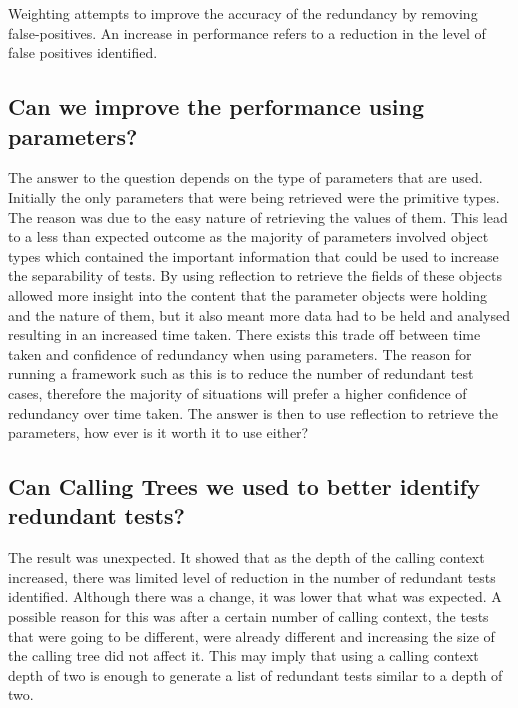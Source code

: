 Weighting attempts to improve the accuracy of the redundancy by removing false-positives. An increase in performance refers to a reduction in the level of false positives identified. 


\subsection{Can we improve the performance using parameters?}

The answer to the question depends on the type of parameters that are used. Initially the only parameters that were being retrieved were the primitive types. The reason was due to the easy nature of retrieving the values of them. This lead to a less than expected outcome as the majority of parameters involved object types which contained the important information that could be used to increase the separability of tests. By using reflection to retrieve the fields of these objects allowed more insight into the content that the parameter objects were holding and the nature of them, but it also meant more data had to be held and analysed resulting in an increased time taken. There exists this trade off between time taken and confidence of redundancy when using parameters. The reason for running a framework such as this is to reduce the number of redundant test cases, therefore the majority of situations will prefer a higher confidence of redundancy over time taken. The answer is then to use reflection to retrieve the parameters, how ever is it worth it to use either?


\subsection{Can Calling Trees we used to better identify redundant tests?}

The result was unexpected. It showed that as the depth of the calling context increased, there was limited level of reduction in the number of redundant tests identified. Although there was a change, it was lower that what was expected. A possible reason for this was after a certain number of calling context, the tests that were going to be different, were already different and increasing the size of the calling tree did not affect it. This may imply that using a calling context depth of two is enough to generate a list of redundant tests similar to a depth of two.

